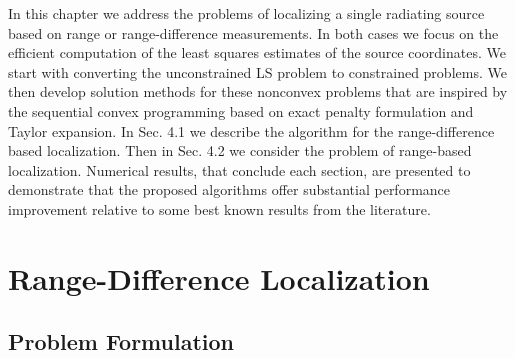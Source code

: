 \label{chapter:scp}

%
%
%
%


In this chapter we address the problems of localizing a single radiating source based on range or range-difference measurements. In both cases we focus on the efficient computation of the least squares estimates of the source coordinates. We start with converting the unconstrained LS problem to  constrained problems. We then develop solution methods for these nonconvex problems that are inspired by the sequential convex programming based on exact penalty formulation and Taylor expansion. In Sec. 4.1 we describe the  algorithm for the range-difference based localization. Then in Sec. 4.2 we consider the problem of range-based localization. Numerical results, that conclude each section, are presented to demonstrate that the proposed algorithms offer substantial performance improvement relative to some best known results from the literature.



\section{Range-Difference Localization}
\subsection{Problem Formulation}

